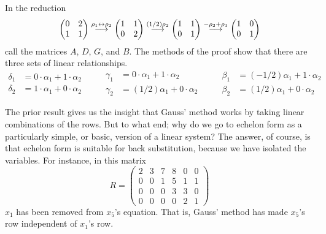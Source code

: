 \begin{example}
In the reduction
\begin{equation*}
    \begin{pmatrix}
       0  &2  \\
       1  &1
     \end{pmatrix}
    \mathrel{ \mathop{\longrightarrow}\limits^{\rho_1\leftrightarrow\rho_2\mathstrut}_{ \begin{subarray}{l} \relax \end{subarray}}}
    \begin{pmatrix}
       1  &1  \\
       0  &2
     \end{pmatrix}                  
    \mathrel{ \mathop{\longrightarrow}\limits^{(1/2)\rho_2\mathstrut}_{ \begin{subarray}{l} \relax \end{subarray}}}
    \begin{pmatrix}
       1  &1  \\
       0  &1
     \end{pmatrix}                   
    \mathrel{ \mathop{\longrightarrow}\limits^{-\rho_2+\rho_1\mathstrut}_{ \begin{subarray}{l} \relax \end{subarray}}}
    \begin{pmatrix}
       1  &0  \\
       0  &1
     \end{pmatrix}
\end{equation*}
call the matrices \( A \), \( D \), \( G \), and \( B \).
The methods of the proof show that there are three sets of linear
relationships. 
\begin{equation*}
  \begin{aligned}
     \delta_1 &=0\cdot\alpha_1+1\cdot\alpha_2         \\
     \delta_2 &=1\cdot\alpha_1+0\cdot\alpha_2
  \end{aligned}
  \qquad
  \begin{aligned}
     \gamma_1 &=0\cdot\alpha_1+1\cdot\alpha_2         \\
     \gamma_2 &=(1/2)\alpha_1+0\cdot\alpha_2
  \end{aligned}
  \qquad
  \begin{aligned}
     \beta_1 &=(-1/2)\alpha_1+1\cdot\alpha_2        \\
     \beta_2 &=(1/2)\alpha_1+0\cdot\alpha_2
  \end{aligned}
\end{equation*}
\end{example}

The prior result gives us the insight that Gauss' method works by taking
linear combinations of the rows.
But to what end; why do we go to echelon form as a particularly simple, or
basic, version of a linear system?
The answer, of course, is that echelon form is suitable for back substitution,
because we have isolated the variables.
For instance, in this matrix
\begin{equation*}
  R=\begin{pmatrix}
    2  &3  &7  &8  &0  &0  \\
    0  &0  &1  &5  &1  &1  \\
    0  &0  &0  &3  &3  &0  \\
    0  &0  &0  &0  &2  &1
  \end{pmatrix}
\end{equation*}
$x_1$ has been removed from $x_5$'s equation.
That is, Gauss' method has made $x_5$'s row independent of $x_1$'s row.

